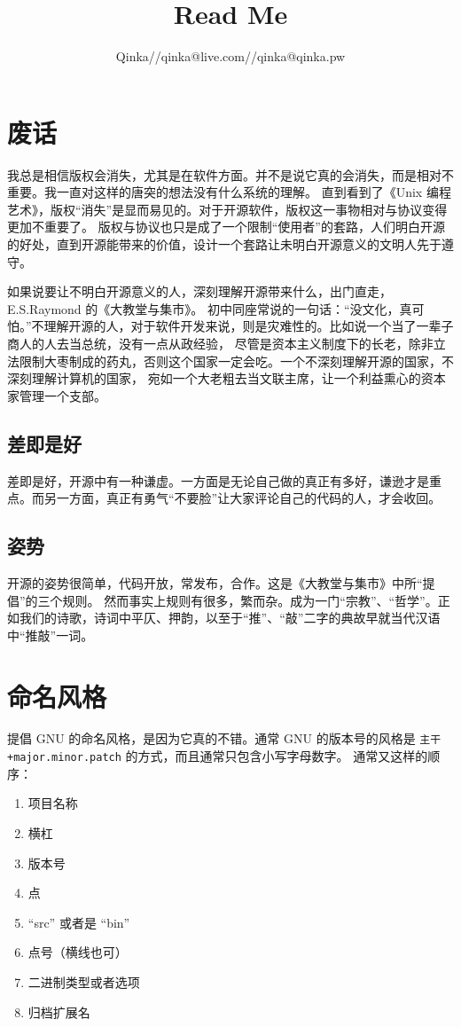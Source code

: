 \documentclass{ctexart}
\author{Qinka//qinka@live.com//qinka@qinka.pw}
\title{Read Me}
\begin{document}
\maketitle

\section{废话}

我总是相信版权会消失，尤其是在软件方面。并不是说它真的会消失，而是相对不重要。我一直对这样的唐突的想法没有什么系统的理解。
直到看到了《Unix 编程艺术》，版权“消失”是显而易见的。对于开源软件，版权这一事物相对与协议变得更加不重要了。
版权与协议也只是成了一个限制“使用者”的套路，人们明白开源的好处，直到开源能带来的价值，设计一个套路让未明白开源意义的文明人先于遵守。

如果说要让不明白开源意义的人，深刻理解开源带来什么，出门直走，E.S.Raymond 的《大教堂与集市》。
初中同座常说的一句话：“没文化，真可怕。”不理解开源的人，对于软件开发来说，则是灾难性的。比如说一个当了一辈子商人的人去当总统，没有一点从政经验，
尽管是资本主义制度下的长老，除非立法限制大枣制成的药丸，否则这个国家一定会吃。一个不深刻理解开源的国家，不深刻理解计算机的国家，
宛如一个大老粗去当文联主席，让一个利益熏心的资本家管理一个支部。

\subsection{差即是好}

差即是好，开源中有一种谦虚。一方面是无论自己做的真正有多好，谦逊才是重点。而另一方面，真正有勇气“不要脸”让大家评论自己的代码的人，才会收回。

\subsection{姿势}

开源的姿势很简单，代码开放，常发布，合作。这是《大教堂与集市》中所“提倡”的三个规则。
然而事实上规则有很多，繁而杂。成为一门“宗教”、“哲学”。正如我们的诗歌，诗词中平仄、押韵，以至于“推”、“敲”二字的典故早就当代汉语中“推敲”一词。

\section{命名风格}

提倡 GNU 的命名风格，是因为它真的不错。通常 GNU 的版本号的风格是 \verb|主干+major.minor.patch| 的方式，而且通常只包含小写字母数字。
通常又这样的顺序：
\begin{enumerate}
\item 项目名称
\item 横杠
\item 版本号
\item 点
\item “src” 或者是 “bin”
\item 点号（横线也可）
\item 二进制类型或者选项
\item 归档扩展名
\end{enumerate}
\end{document}
